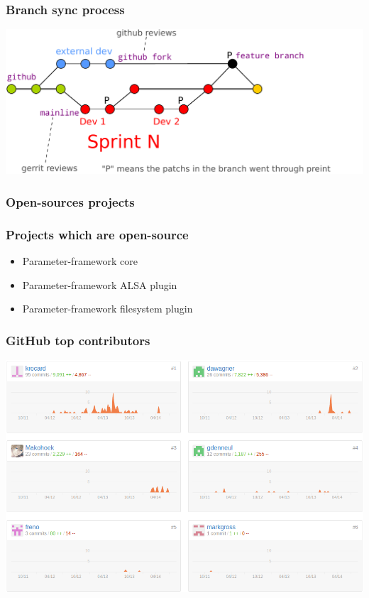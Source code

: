 \begin{frame}
    \frametitle{Branch sync process}
    \centering
    \includegraphics[width=\textwidth]{../../report/src/img/branches-process.pdf}
\end{frame}

\subsubsection{Open-sources projects}
\begin{frame}
    \frametitle{Projects which are open-source}
    \begin{itemize}
        \item Parameter-framework core
        \item Parameter-framework ALSA plugin
        \item Parameter-framework filesystem plugin
    \end{itemize}
\end{frame}

\begin{frame}
    \frametitle{GitHub top contributors}
    \centering
    \includegraphics[width=\textwidth]{../../report/src/img/statsGitHub.png}
\end{frame}

